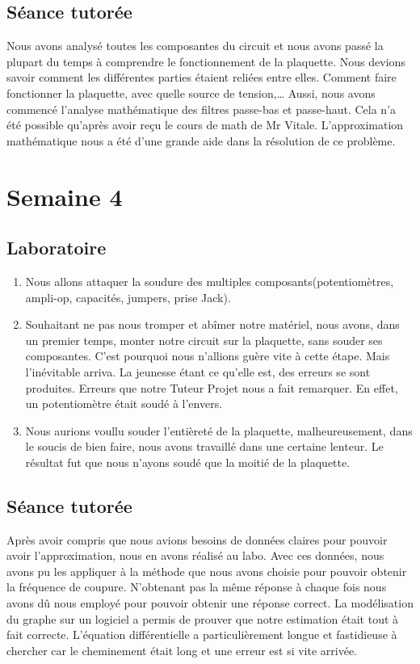 \documentclass{article}
\begin{document}
\subsection{Séance tutorée}
Nous avons analysé toutes les composantes du circuit et nous avons passé la plupart du temps à comprendre le fonctionnement de la plaquette.  Nous devions savoir comment les différentes parties étaient reliées entre elles.  Comment faire fonctionner la plaquette, avec quelle source de tension,…  Aussi, nous avons commencé  l’analyse mathématique des filtres passe-bas et passe-haut.  Cela n’a été possible qu’après avoir reçu le cours de math de Mr Vitale.  L’approximation mathématique nous a été d’une grande aide dans la résolution de ce problème.

\section{Semaine 4}
\subsection{Laboratoire}
\begin{enumerate}
	\item Nous allons attaquer la soudure des multiples composants(potentiomètres, ampli-op, capacités, jumpers, prise Jack). 
	\item Souhaitant ne pas nous tromper et abîmer notre matériel, nous avons, dans un premier temps, monter notre circuit sur 
				la plaquette, sans souder ses composantes. C'est pourquoi nous n'allions guère vite à cette étape. Mais l'inévitable 
				arriva. La jeunesse étant ce qu'elle est, des erreurs se sont produites. Erreurs 
				que notre Tuteur Projet nous a fait remarquer. En effet, un potentiomètre était soudé à l'envers.    
	\item Nous aurions voullu souder l'entièreté de la plaquette, malheureusement, dans le soucis de bien faire, nous avons 
				travaillé dans une certaine lenteur. Le résultat fut que nous n'ayons soudé que la moitié de la plaquette.
\end{enumerate}

\subsection{Séance tutorée}
Après avoir compris que nous avions besoins de données claires pour pouvoir avoir l’approximation, nous en avons réalisé au labo.  Avec ces données, nous avons pu les appliquer à la méthode que nous avons choisie pour pouvoir obtenir la fréquence de coupure.  N’obtenant pas la même réponse à chaque fois nous avons dû nous employé pour pouvoir obtenir une réponse correct.  La modélisation du graphe sur un logiciel a permis de prouver que notre estimation était tout à fait correcte.  L’équation différentielle a particulièrement longue et fastidieuse à chercher car le cheminement était long et une erreur est si vite arrivée.
\end{document}
